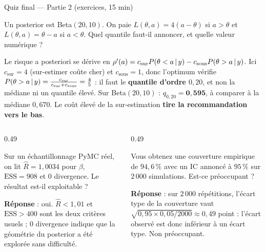 \begin{frame}{Quiz final --- Partie 2 (exercices, 15 min)}
\footnotesize
\vspace{-2mm}
\begin{qbox}
Un posterior est Beta$(20,10)$. On paie $L(\theta,a) = 4(a-\theta)$ si $a>\theta$ et
$L(\theta,a)=\theta-a$ si $a<\theta$. Quel quantile faut-il annoncer, et quelle
valeur numérique ?
\vspace{1mm}
\begin{solbox}
Le risque a posteriori se dérive en
$\rho'(a) = c_{\text{sur}}P(\theta<a \,\vert\, y) - c_{\text{sous}}P(\theta>a \,\vert\, y)$.
Ici $c_{\text{sur}} = 4$ (sur-estimer coûte cher) et
$c_{\text{sous}} = 1$, donc l'optimum vérifie
$P(\theta > a \,\vert\, y) = \frac{c_{\text{sur}}}{c_{\text{sur}} + c_{\text{sous}}}
= \frac{4}{5}$ : il faut le \textbf{quantile d'ordre $0{,}20$}, et non la médiane
ni un quantile élevé. Sur Beta$(20,10)$ : $q_{0{,}20} = \mathbf{0{,}595}$,
à comparer à la médiane $0{,}670$. Le coût élevé de la sur-estimation
\textbf{tire la recommandation vers le bas}.
\end{solbox}
\end{qbox}
\vspace{1mm}
\begin{columns}[t]
\begin{column}{0.49\textwidth}
\begin{qbox}
Sur un échantillonnage PyMC réel, on lit $\hat R = 1{,}0034$ pour $\beta$,
$\mathrm{ESS} = 908$ et $0$ divergence. Le résultat est-il exploitable ?
\vspace{1mm}

\textbf{Réponse} : oui. $\hat R < 1{,}01$ et $\mathrm{ESS} > 400$ sont les deux
critères usuels ; $0$ divergence indique que la géométrie du posterior a été
explorée sans difficulté.
\end{qbox}
\end{column}
\begin{column}{0.49\textwidth}
\begin{qbox}
Vous obtenez une couverture empirique de $94{,}6\,\%$ avec un IC annoncé à
$95\,\%$ sur $2\,000$ simulations. Est-ce préoccupant ?
\vspace{1mm}

\textbf{Réponse} : sur $2\,000$ répétitions, l'écart type de la couverture vaut
$\sqrt{0{,}95 \times 0{,}05/2000} \approx 0{,}49$ point : l'écart observé est donc
inférieur à un écart type. Non préoccupant.
\end{qbox}
\end{column}
\end{columns}
\end{frame}

